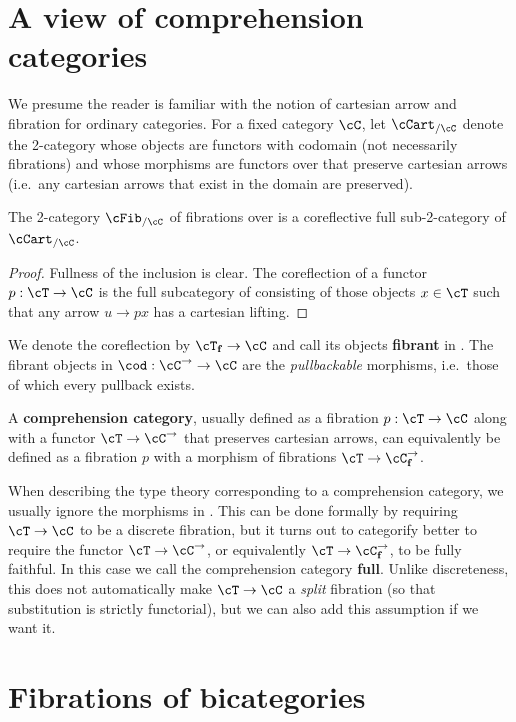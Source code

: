 \documentclass{amsart}
\def\f{_{\mathbf{f}}}
\begin{document}
\section{A view of comprehension categories}
\label{sec:compcat}

We presume the reader is familiar with the notion of cartesian arrow and fibration for ordinary categories.
For a fixed category $\cC$, let $\cCart_{/\cC}$ denote the 2-category whose objects are functors with codomain \cC (not necessarily fibrations) and whose morphisms are functors over \cC that preserve cartesian arrows (i.e.\ any cartesian arrows that exist in the domain are preserved).

\begin{thm}
  The 2-category $\cFib_{/\cC}$ of fibrations over \cC is a coreflective full sub-2-category of $\cCart_{/\cC}$.
\end{thm}
\begin{proof}
  Fullness of the inclusion is clear.
  The coreflection of a functor $p:\cT\to\cC$ is the full subcategory of \cT consisting of those objects $x\in \cT$ such that any arrow $u\to p x$ has a cartesian lifting.
\end{proof}

We denote the coreflection by $\cT\f \to \cC$ and call its objects \textbf{fibrant} in \cT.
The fibrant objects in $\cod: \cC^\to \to \cC$ are the \emph{pullbackable} morphisms, i.e.\ those of which every pullback exists.

A \textbf{comprehension category}, usually defined as a fibration $p:\cT\to\cC$ along with a functor $\cT\to\cC^\to$ that preserves cartesian arrows, can equivalently be defined as a fibration $p$ with a morphism of fibrations $\cT\to\cC^\to\f$.

When describing the type theory corresponding to a comprehension category, we usually ignore the morphisms in \cT.
This can be done formally by requiring $\cT\to\cC$ to be a discrete fibration, but it turns out to categorify better to require the functor $\cT\to\cC^\to$, or equivalently $\cT\to\cC^\to\f$, to be fully faithful.
In this case we call the comprehension category \textbf{full}.
Unlike discreteness, this does not automatically make $\cT\to\cC$ a \emph{split} fibration (so that substitution is strictly functorial), but we can also add this assumption if we want it.


\section{Fibrations of bicategories}
\label{sec:fib-bicat}
\end{document}
